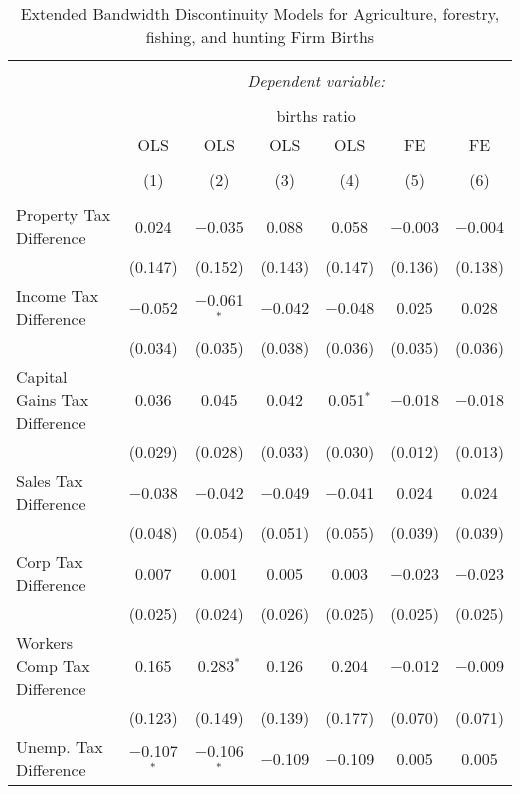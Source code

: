 
\begin{table}[!htbp] \centering 
  \caption{Extended Bandwidth Discontinuity Models for  Agriculture, forestry, fishing, and hunting Firm Births} 
  \label{11eb} 
\footnotesize 
\begin{tabular}{@{\extracolsep{5pt}}lcccccc} 
\\[-1.8ex]\hline 
\hline \\[-1.8ex] 
 & \multicolumn{6}{c}{\textit{Dependent variable:}} \\ 
\cline{2-7} 
\\[-1.8ex] & \multicolumn{6}{c}{births ratio} \\ 
 & OLS & OLS & OLS & OLS & FE & FE \\ 
\\[-1.8ex] & (1) & (2) & (3) & (4) & (5) & (6)\\ 
\hline \\[-1.8ex] 
 Property Tax Difference & 0.024 & $-$0.035 & 0.088 & 0.058 & $-$0.003 & $-$0.004 \\ 
  & (0.147) & (0.152) & (0.143) & (0.147) & (0.136) & (0.138) \\ 
  Income Tax Difference & $-$0.052 & $-$0.061$^{*}$ & $-$0.042 & $-$0.048 & 0.025 & 0.028 \\ 
  & (0.034) & (0.035) & (0.038) & (0.036) & (0.035) & (0.036) \\ 
  Capital Gains Tax Difference & 0.036 & 0.045 & 0.042 & 0.051$^{*}$ & $-$0.018 & $-$0.018 \\ 
  & (0.029) & (0.028) & (0.033) & (0.030) & (0.012) & (0.013) \\ 
  Sales Tax Difference & $-$0.038 & $-$0.042 & $-$0.049 & $-$0.041 & 0.024 & 0.024 \\ 
  & (0.048) & (0.054) & (0.051) & (0.055) & (0.039) & (0.039) \\ 
  Corp Tax Difference & 0.007 & 0.001 & 0.005 & 0.003 & $-$0.023 & $-$0.023 \\ 
  & (0.025) & (0.024) & (0.026) & (0.025) & (0.025) & (0.025) \\ 
  Workers Comp Tax Difference & 0.165 & 0.283$^{*}$ & 0.126 & 0.204 & $-$0.012 & $-$0.009 \\ 
  & (0.123) & (0.149) & (0.139) & (0.177) & (0.070) & (0.071) \\ 
  Unemp. Tax Difference & $-$0.107$^{*}$ & $-$0.106$^{*}$ & $-$0.109 & $-$0.109 & 0.005 & 0.005 \\ 

\end{tabular}
\end{table}
